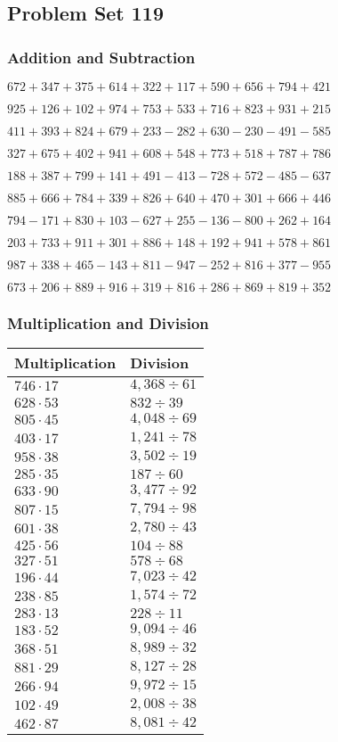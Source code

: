 \hypertarget{problem-set-119}{%
\subsection{Problem Set 119}\label{problem-set-119}}

\hypertarget{addition-and-subtraction}{%
\subsubsection{Addition and
Subtraction}\label{addition-and-subtraction}}

\(672 +347 +375 +614 +322 +117 +590 +656 +794 +421\)

\(925 +126 +102 +974 +753 +533 +716 +823 +931 +215\)

\(411 +393 +824 +679 +233 - 282 +630 - 230 - 491 - 585\)

\(327 +675 +402 +941 +608 +548 +773 +518 +787 +786\)

\(188 +387 +799 +141 +491 - 413 - 728 +572 - 485 - 637\)

\(885 +666 +784 +339 +826 +640 +470 +301 +666 +446\)

\(794 - 171 +830 +103 - 627 +255 - 136 - 800 +262 +164\)

\(203 +733 +911 +301 +886 +148 +192 +941 +578 +861\)

\(987 +338 +465 - 143 +811 - 947 - 252 +816 +377 - 955\)

\(673 +206 +889 +916 +319 +816 +286 +869 +819 +352\)

\hypertarget{multiplication-and-division}{%
\subsubsection{Multiplication and
Division}\label{multiplication-and-division}}

\begin{longtable}[]{@{}ll@{}}
\toprule
Multiplication & Division\tabularnewline
\midrule
\endhead
\(746 \cdot 17\) & \(4,368÷61\)\tabularnewline
\(628 \cdot 53\) & \(832÷39\)\tabularnewline
\(805 \cdot 45\) & \(4,048÷69\)\tabularnewline
\(403 \cdot 17\) & \(1,241÷78\)\tabularnewline
\(958 \cdot 38\) & \(3,502÷19\)\tabularnewline
\(285 \cdot 35\) & \(187÷60\)\tabularnewline
\(633 \cdot 90\) & \(3,477÷92\)\tabularnewline
\(807 \cdot 15\) & \(7,794÷98\)\tabularnewline
\(601 \cdot 38\) & \(2,780÷43\)\tabularnewline
\(425 \cdot 56\) & \(104÷88\)\tabularnewline
\(327 \cdot 51\) & \(578÷68\)\tabularnewline
\(196 \cdot 44\) & \(7,023÷42\)\tabularnewline
\(238 \cdot 85\) & \(1,574÷72\)\tabularnewline
\(283 \cdot 13\) & \(228÷11\)\tabularnewline
\(183 \cdot 52\) & \(9,094÷46\)\tabularnewline
\(368 \cdot 51\) & \(8,989÷32\)\tabularnewline
\(881 \cdot 29\) & \(8,127÷28\)\tabularnewline
\(266 \cdot 94\) & \(9,972÷15\)\tabularnewline
\(102 \cdot 49\) & \(2,008÷38\)\tabularnewline
\(462 \cdot 87\) & \(8,081÷42\)\tabularnewline
\bottomrule
\end{longtable}
